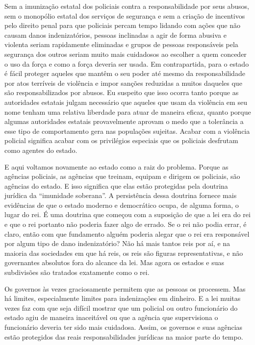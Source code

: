 Sem a imunização estatal dos policiais contra a responsabilidade por seus abusos, sem o monopólio estatal dos serviços de segurança e sem a criação de incentivos pelo direito penal para que policiais percam tempo lidando com ações que não causam danos indenizatórios, pessoas inclinadas a agir de forma abusiva e violenta seriam rapidamente eliminadas e grupos de pessoas responsáveis pela segurança dos outros seriam muito mais cuidadosos ao escolher a quem conceder o uso da força e como a força deveria ser usada. Em contrapartida, para o estado é fácil proteger aqueles que mantêm o seu poder até mesmo da responsabilidade por atos terríveis de violência e impor sanções reduzidas a muitos daqueles que são responsabilizados por abusos. Eu suspeito que isso ocorra tanto porque as autoridades estatais julgam necessário que aqueles que usam da violência em seu nome tenham uma relativa liberdade para atuar de maneira eficaz, quanto porque algumas autoridades estatais provavelmente aprovam o medo que a tolerância a esse tipo de comportamento gera nas populações sujeitas. Acabar com a violência policial significa acabar com os privilégios especiais que os policiais desfrutam como agentes do estado.

E aqui voltamos novamente ao estado como a raiz do problema. Porque as agências policiais, as agências que treinam, equipam e dirigem os policiais, são agências do estado. E isso significa que elas estão protegidas pela doutrina jurídica da ``imunidade soberana''. A persistência dessa doutrina fornece mais evidências de que o estado moderno e democrático ocupa, de alguma forma, o lugar do rei. É uma doutrina que começou com a suposição de que a lei era do rei e que o rei portanto não poderia fazer algo de errado. Se o rei não podia errar, é claro, então com que fundamento alguém poderia alegar que o rei era responsável por algum tipo de dano indenizatório? Não há mais tantos reis por aí, e na maioria das sociedades em que há reis, os reis são figuras representativas, e não governantes absolutos fora do alcance da lei. Mas agora os estados e suas subdivisões são tratados exatamente como o rei.

Os governos às vezes graciosamente permitem que as pessoas os processem. Mas há limites, especialmente limites para indenizações em dinheiro. E a lei muitas vezes faz com que seja difícil mostrar que um policial ou outro funcionário do estado agiu de maneira inaceitável ou que a agência que supervisiona o funcionário deveria ter sido mais cuidadosa. Assim, os governos e suas agências estão protegidos das reais responsabilidades jurídicas na maior parte do tempo.

